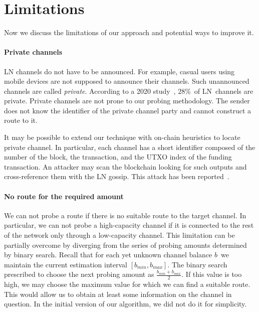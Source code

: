 \section{Limitations}

Now we discuss the limitations of our approach and potential ways to improve it.

\paragraph{Private channels}

LN channels do not have to be announced.
For example, casual users using mobile devices are not supposed to announce their channels.
Such unannounced channels are called \textit{private}.
According to a 2020 study~\cite{BitMEXPrivateChannels}, $28$\%~of LN~channels are private.
Private channels are not prone to our probing methodology.
The sender does not know the identifier of the private channel party and cannot construct a route to it.

It may be possible to extend our technique with on-chain heuristics to locate private channel.
In particular, each channel has a short identifier composed of the number of the block, the transaction, and the UTXO index of the funding transaction.
An attacker may scan the blockchain looking for such outputs and cross-reference them with the LN gossip.
This attack has been reported~\cite{Pickhardt2020}.

\paragraph{No route for the required amount}

We can not probe a route if there is no suitable route to the target channel.
In particular, we can not probe a high-capacity channel if it is connected to the rest of the network only through a low-capacity channel.
This limitation can be partially overcome by diverging from the series of probing amounts determined by binary search.
Recall that for each yet unknown channel balance $b$~we maintain the current estimation interval $[b_{min}, b_{max}]$.
The binary search prescribed to choose the next probing amount as $\frac{b_{min} + b_{max}}{2}$.
If this value is too high, we may choose the maximum value for which we can find a suitable route.
This would allow us to obtain at least some information on the channel in question.
In the initial version of our algorithm, we did not do it for simplicity.

